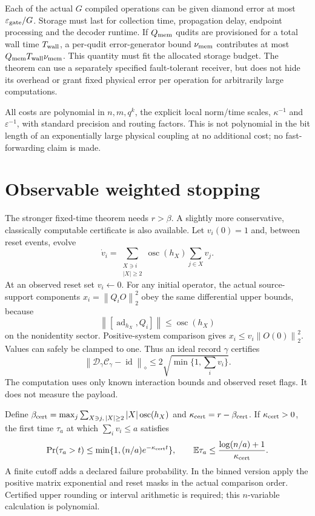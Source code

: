 \documentclass[11pt,a4paper]{article}
\newcommand{\id}{\operatorname{id}}\newcommand{\Tr}{\operatorname{Tr}}\newcommand{\osc}{\operatorname{osc}}
\newcommand{\norm}[1]{\left\lVert #1\right\rVert}\newcommand{\ket}[1]{\lvert #1\rangle}\newcommand{\bra}[1]{\langle #1\rvert}
\newcommand{\cC}{\mathcal C}\newcommand{\cD}{\mathcal D}\newcommand{\cR}{\mathcal R}\newcommand{\cV}{\mathcal V}\newcommand{\cJ}{\mathcal J}
\begin{document}
Each of the actual $G$ compiled operations can be given diamond error at most $\varepsilon_{\rm gate}/G$. Storage must last for collection time, propagation delay, endpoint processing and the decoder runtime. If $Q_{\rm mem}$ qudits are provisioned for a total wall time $T_{\rm wall}$, a per-qudit error-generator bound $\nu_{\rm mem}$ contributes at most $Q_{\rm mem}T_{\rm wall}\nu_{\rm mem}$. This quantity must fit the allocated storage budget. The theorem can use a separately specified fault-tolerant receiver, but does not hide its overhead or grant fixed physical error per operation for arbitrarily large computations.

All costs are polynomial in $n,m,q^k$, the explicit local norm/time scales, $\kappa^{-1}$ and $\varepsilon^{-1}$, with standard precision and routing factors. This is not polynomial in the bit length of an exponentially large physical coupling at no additional cost; no fast-forwarding claim is made.

\section{Observable weighted stopping}

The stronger fixed-time theorem needs $r>\beta$. A slightly more conservative, classically computable certificate is also available. Let $v_i(0)=1$ and, between reset events, evolve
\begin{equation}
\dot v_i=\sum_{\substack{X\ni i\\|X|\ge2}}\osc(h_X)\sum_{j\in X}v_j.
\end{equation}
At an observed reset set $v_i\gets0$. For any initial operator, the actual source-support components $x_i=\norm{Q_iO}_2^2$ obey the same differential upper bounds, because
\begin{equation}
\norm{[\operatorname{ad}_{h_X},Q_i]}\le\osc(h_X)
\end{equation}
on the nonidentity sector. Positive-system comparison gives $x_i\le v_i\norm{O(0)}_2^2$. Values can safely be clamped to one. Thus an ideal record $\gamma$ certifies
\begin{equation}
\boxed{\norm{\cD_\gamma\cC_\gamma-\id}_\diamond
\le2\sqrt{\min\{1,\sum_iv_i\}}.}
\end{equation}
The computation uses only known interaction bounds and observed reset flags. It does not measure the payload.

Define $\beta_{\rm cert}=\max_j\sum_{X\ni j,\,|X|\ge2}|X|\osc(h_X)$ and $\kappa_{\rm cert}=r-\beta_{\rm cert}$. If $\kappa_{\rm cert}>0$, the first time $\tau_a$ at which $\sum_iv_i\le a$ satisfies
\begin{equation}
\Pr(\tau_a>t)\le\min\{1,(n/a)e^{-\kappa_{\rm cert}t}\},\qquad
\mathbb E\tau_a\le\frac{\log(n/a)+1}{\kappa_{\rm cert}}.
\end{equation}
A finite cutoff adds a declared failure probability. In the binned version apply the positive matrix exponential and reset masks in the actual comparison order. Certified upper rounding or interval arithmetic is required; this $n$-variable calculation is polynomial.
\end{document}
